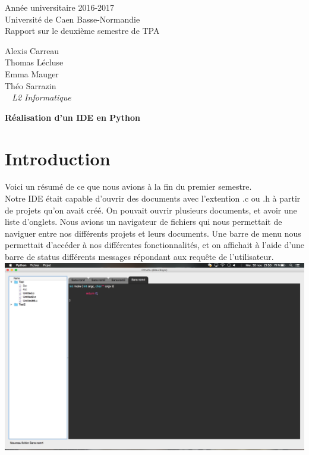 \documentclass[a4paper,12pt]{article}
\begin{document}
\begin{titlepage}
	\begin{center}
		\Large{Année universitaire 2016-2017}\\
		\Large{Université de Caen Basse-Normandie}\\[1cm]
		
		\huge{Rapport sur le deuxième semestre de TPA}\\
		\vspace{3cm}
		
		Alexis Carreau\\
		Thomas Lécluse\\
		Emma Mauger\\
		Théo Sarrazin\\
		
		\normalsize{\textit{ ~ L2 Informatique}}\\
		\medskip
		\vspace{2cm}
		
		\huge{\textbf{Réalisation d'un IDE en Python}}
		
	\end{center}
\end{titlepage}

\tableofcontents
\newpage

\section{Introduction}

	Voici un résumé de ce que nous avions à la fin du premier semestre.\\
	
	Notre IDE était capable d'ouvrir des documents avec l'extention .c ou .h à partir de projets qu'on avait créé. On pouvait ouvrir plusieurs documents, et avoir une liste d'onglets. Nous avions un navigateur de fichiers qui nous permettait de naviguer entre nos différents projets et leurs documents. Une barre de menu nous permettait d'accéder à nos différentes fonctionnalités, et on affichait à l'aide d'une barre de status différents messages répondant aux requête de l'utilisateur.\\
	
	\includegraphics[scale=0.3]{images/ide_v1.png}
	
\end{document}
